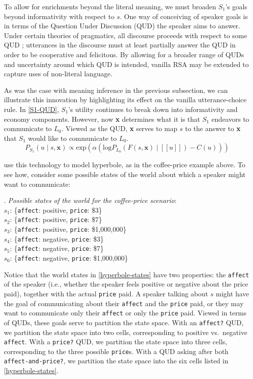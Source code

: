 \documentclass{sp}
\newcommand{\sem}[1]{\ensuremath{[\![#1]\!]}}
\begin{document}
To allow for enrichments beyond the literal meaning, we must broaden $S_1$'s goals beyond informativity with respect to $s$. One way of conceiving of speaker goals is in terms of the Question Under Discussion (QUD) the speaker aims to answer. Under certain theories of pragmatics, all discourse proceeds with respect to some QUD \citep{roberts2012}; utterances in the discourse must at least partially answer the QUD in order to be cooperative and felicitous. By allowing for a broader range of QUDs and uncertainty around which QUD is intended, vanilla RSA may be extended to capture uses of non-literal language.

As was the case with meaning inference in the previous subsection, we can illustrate this innovation by highlighting its effect on the vanilla utterance-choice rule. In \eqref{S1-QUD}, $S_1$'s utility continues to break down into informativity and economy components. However, now \textbf{x} determines what it is that $S_1$ endeavors to communicate to $L_0$. Viewed as the QUD, \textbf{x} serves to map $s$ to the answer to \textbf{x} that $S_1$ would like to communicate to $L_0$.
\begin{equation} \label{S1-QUD}
P_{S_1}(u\mid s, \textbf{x}) \propto \textrm{exp}(\alpha (\textrm{log}P_{L_0}(F(s,\textbf{x})\mid \sem{u}) - C(u)))
\end{equation}

\cite{kaoetal2014} use this technology to model hyperbole, as in the coffee-price example above. To see how, consider some possible states of the world about which a speaker might want to communicate:

\ex. \label{hyperbole-states}
\emph{Possible states of the world for the coffee-price scenario}:\\
$s_1$: \{\texttt{affect}: positive, \texttt{price}: \$3\}\\
$s_2$: \{\texttt{affect}: positive, \texttt{price}: \$7\}\\
$s_3$: \{\texttt{affect}: positive, \texttt{price}: \$1,000,000\}\\
$s_4$: \{\texttt{affect}: negative, \texttt{price}: \$3\}\\
$s_5$: \{\texttt{affect}: negative, \texttt{price}: \$7\}\\
$s_6$: \{\texttt{affect}: negative, \texttt{price}: \$1,000,000\}

Notice that the world states in \ref{hyperbole-states} have two properties: the \texttt{affect} of the speaker (i.e., whether the speaker feels positive or negative about the price paid), together with the actual \texttt{price} paid. A speaker talking about $s$ might have the goal of communicating about their \texttt{affect} and the \texttt{price} paid, or they may want to communicate only their \texttt{affect} or only the \texttt{price} paid. Viewed in terms of QUDs, these goals serve to partition the state space. With an \texttt{affect?} QUD, we partition the state space into two cells, corresponding to positive vs.~negative \texttt{affect}. With a \texttt{price?} QUD, we partition the state space into three cells, corresponding to the three possible \texttt{price}s. With a QUD asking after both \texttt{affect-and-price?}, we partition the state space into the six cells listed in \ref{hyperbole-states}.
\end{document}
